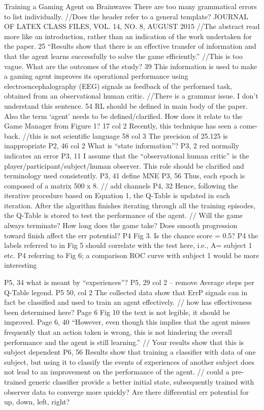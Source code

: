 \documentclass[journal,onecolumn,12pt]{IEEEtran}
\begin{document}
Training a Gaming Agent on Brainwaves
There are too many grammatical errors to list individually.
//Does the header refer to a general template?
JOURNAL OF LATEX CLASS FILES, VOL. 14, NO. 8, AUGUST 2015
//The abstract read more like an introduction, rather than an indication of the work undertaken for the paper.
25 “Results show that there is an effective transfer of information and that
the agent learns successfully to solve the game efficiently.”
//This is too vague. What are the outcomes of the study?
39 This information is used to make a gaming agent improves its operational performance using electroencephalography (EEG) signals as feedback of the performed task, obtained from an observational human critic.
//There is a grammar issue. I don’t understand this sentence.
54 RL should be defined in main body of the paper. Also the term ‘agent’ needs to be defined/clarified. How does it relate to the Game Manager from Figure 1?
17 col 2 Recently, this technique has seen a come-back. //this is not scientific language
58 col 3 The precision of 25.125 is inappropriate P2, 46 col 2 What is “state information”?
P3, 2 red normally indicates an error
P3, 11 I assume that the “observational human critic” is the player/participant/subject/human observer. This role should be clarified and terminology used consistently.
P3, 41 define MNE
P3, 56 Thus, each epoch is composed of a matrix 500 x 8. // add channels
P4, 32 Hence, following the iterative procedure based on Equation 1, the Q-Table is updated in each iteration. After the algorithm finishes iterating through all the training episodes, the Q-Table is stored to test the performance of the agent.
// Will the game always terminate? How long does the game take? Does smooth progression toward finish affect the err potential?
P4 Fig 3. Is the chance score = 0.5?
P4 the labels referred to in Fig 5 should correlate with the test here, i.e., A= subject 1 etc.
P4 referring to Fig 6; a comparison ROC curve with subject 1 would be more interesting

P5, 34 what is meant by “experiences”?
P5, 29 col 2 – remove Average steps per Q-Table legend.
P5 50, col 2 The collected data show that ErrP signals can in fact be classified and used to train an agent effectively.
// how has effectiveness been determined here?
Page 6 Fig 10 the text is not legible, it should be improved.
Page 6, 40
“However, even though this implies that the agent misses frequently that an action taken is wrong, this is not hindering the overall performance and the agent is still learning.”
// Your results show that this is subject dependent
P6, 56
Results show that training a classifier with data of one subject, but using it
to classify the events of experiences of another subject does
not lead to an improvement on the performance of the agent.
// could a pre-trained generic classifier provide a better initial state, subsequently trained with observer data to converge more quickly?
Are there differential err potential for up, down, left, right?
\end{document}

